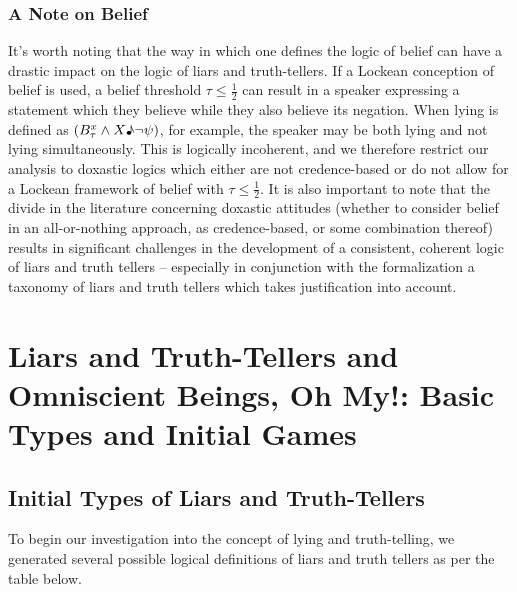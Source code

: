 \documentclass[12pt, titlepage, twoside, a4paper]{report}
\begin{document}
\subsection{A Note on Belief}
It's worth noting that the way in which one defines the logic of belief can have a drastic impact on the logic of liars and truth-tellers. If a Lockean conception of belief is used, a belief threshold $\tau \leq \frac{1}{2}$ can result in a speaker expressing a statement which they believe while they also believe its negation. When lying is defined as $(B^x_{\tau} \wedge X\text{\textmusicalnote} \neg \psi)$, for example, the speaker may be both lying and not lying simultaneously. This is logically incoherent, and we therefore restrict our analysis to doxastic logics which either are not credence-based or do not allow for a Lockean framework of belief with $\tau \leq \frac{1}{2}$. 
It is also important to note that the divide in the literature concerning doxastic attitudes (whether to consider belief in an all-or-nothing approach, as credence-based, or some combination thereof) results in significant challenges in the development of a consistent, coherent logic of liars and truth tellers – especially in conjunction with the formalization a taxonomy of liars and truth tellers which takes justification into account.\autocite{Buchak2014,Jackson2018a,AdamCarter2016,Jackson2018}

\chapter{Liars and Truth-Tellers and Omniscient Beings, Oh My!: Basic Types and Initial Games}
\section{Initial Types of Liars and Truth-Tellers}
To begin our investigation into the concept of lying and truth-telling, we generated several possible logical definitions of liars and truth tellers as per the table below.
\end{document}
